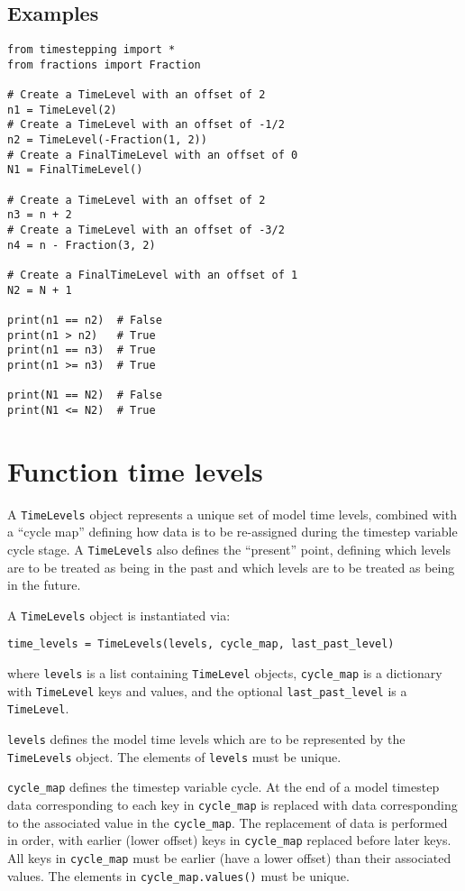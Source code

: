 \documentclass[a4paper]{book}
\begin{document}
\subsection*{Examples}
\begin{lstlisting}
from timestepping import *
from fractions import Fraction

# Create a TimeLevel with an offset of 2
n1 = TimeLevel(2)
# Create a TimeLevel with an offset of -1/2
n2 = TimeLevel(-Fraction(1, 2))
# Create a FinalTimeLevel with an offset of 0
N1 = FinalTimeLevel()

# Create a TimeLevel with an offset of 2
n3 = n + 2
# Create a TimeLevel with an offset of -3/2
n4 = n - Fraction(3, 2)

# Create a FinalTimeLevel with an offset of 1
N2 = N + 1

print(n1 == n2)  # False
print(n1 > n2)   # True
print(n1 == n3)  # True
print(n1 >= n3)  # True

print(N1 == N2)  # False
print(N1 <= N2)  # True
\end{lstlisting}

\section{Function time levels}

A \verb+TimeLevels+ object represents a unique set of model time levels,
combined with a ``cycle map'' defining how data is to be re-assigned during the
timestep variable cycle stage. A \verb+TimeLevels+ also defines the ``present''
point, defining which levels are to be treated as being in the past and which
levels are to be treated as being in the future.

A \verb+TimeLevels+ object is instantiated via:
\begin{lstlisting}
time_levels = TimeLevels(levels, cycle_map, last_past_level)
\end{lstlisting}
where \verb+levels+ is a list containing \verb+TimeLevel+ objects,
\verb+cycle_map+ is a dictionary with \verb+TimeLevel+ keys and values, and the
optional \verb+last_past_level+ is a \verb+TimeLevel+.

\verb+levels+ defines the model time levels which are to be represented by the
\verb+TimeLevels+ object. The elements of \verb+levels+ must be unique.

\verb+cycle_map+ defines the timestep variable cycle. At the end of a model
timestep data corresponding to each key in \verb+cycle_map+ is replaced with
data corresponding to the associated value in the \verb+cycle_map+. The
replacement of data is performed in order, with earlier (lower offset) keys in
\verb+cycle_map+ replaced before later keys. All keys in \verb+cycle_map+ must
be earlier (have a lower offset) than their associated values. The elements in
\verb+cycle_map.values()+ must be unique.
\end{document}

